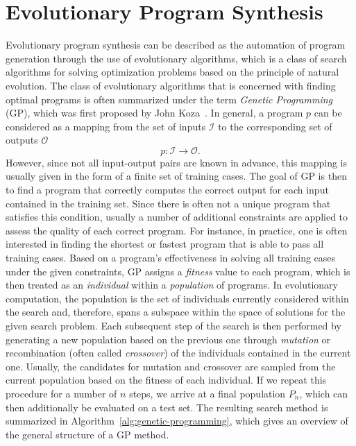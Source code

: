 \section{Evolutionary Program Synthesis}
\label{sec:gggp}
Evolutionary program synthesis can be described as the automation of program generation through the use of evolutionary algorithms, which is a class of search algorithms for solving optimization problems based on the principle of natural evolution.
The class of evolutionary algorithms that is concerned with finding optimal programs is often summarized under the term \emph{Genetic Programming} (GP), which was first proposed by John Koza~\cite{koza1994genetic}.
In general, a program $p$ can be considered as a mapping from the set of inputs $\mathcal{I}$ to the corresponding set of outputs $\mathcal{O}$
\begin{equation}
	p : \mathcal{I} \to \mathcal{O}.
	\label{eq:gp-program}
\end{equation}
However, since not all input-output pairs are known in advance, this mapping is usually given in the form of a finite set of training cases.
The goal of GP is then to find a program that correctly computes the correct output for each input contained in the training set.
Since there is often not a unique program that satisfies this condition, usually a number of additional constraints are applied to assess the quality of each correct program.
For instance, in practice, one is often interested in finding the shortest or fastest program that is able to pass all training cases.
Based on a program's effectiveness in solving all training cases under the given constraints, GP assigns a \emph{fitness} value to each program, which is then treated as an \emph{individual} within a \emph{population} of programs.
In evolutionary computation, the population is the set of individuals currently considered within the search and, therefore, spans a subspace within the space of solutions for the given search problem.
Each subsequent step of the search is then performed by generating a new population based on the previous one through \emph{mutation} or recombination (often called \emph{crossover}) of the individuals contained in the current one.
Usually, the candidates for mutation and crossover are sampled from the current population based on the fitness of each individual.
If we repeat this procedure for a number of $n$ steps, we arrive at a final population $P_n$, which can then additionally be evaluated on a test set.
The resulting search method is summarized in Algorithm~\ref{alg:genetic-programming}, which gives an overview of the general structure of a GP method.
